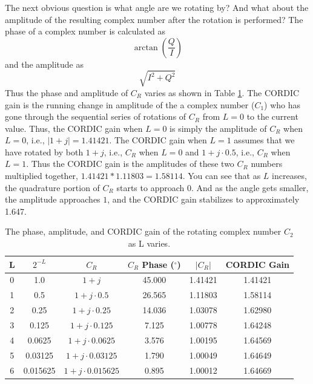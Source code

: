 The next obvious question is what angle are we rotating by? And what about the amplitude of the resulting complex number after the rotation is performed? The phase of a complex number is calculated as 
\begin{equation}
\arctan (\frac{Q}{I})
\end{equation}
and the amplitude as
\begin{equation}
\sqrt{I^2 + Q^2}
\end{equation}
Thus the phase and amplitude of $C_R$ varies as shown in Table \ref{table:complexcordic}. The CORDIC gain is the running change in amplitude of the a complex number ($C_1$) who has gone through the sequential series of rotations of $C_R$ from $L = 0$ to the current value. Thus, the CORDIC gain when $L=0$ is simply the amplitude of $C_R$ when $L=0$, i.e., $| 1 + j | = 1.41421$. The CORDIC gain when $L = 1$ assumes that we have rotated by both $1 + j$, i.e., $C_R$ when $L=0$ and $1 + j \cdot 0.5$, i.e., $C_R$ when $L=1$. Thus the CORDIC gain is the amplitudes of these two $C_R$ numbers multiplied together, $1.41421 * 1.11803 = 1.58114$. You can see that as $L$ increases, the quadrature portion of $C_R$ starts to approach $0$. And as the angle gets smaller, the amplitude approaches $1$, and the CORDIC gain stabilizes to approximately 1.647. 


\begin{table}[htbp]
\caption{The phase, amplitude, and CORDIC gain of the rotating complex number $C_2$ as L varies.}
\begin{center}
\begin{tabular}{|c|c|c|c|c|c|}
\hline
L & $2^{-L}$ 	& $C_R$ 				& $C_R$ Phase ($^{\circ}$) 	& $| C_R |$ 		& CORDIC Gain 	\\ \hline \hline
0 & 1.0 		& $1 + j$  				& 45.000					& 1.41421			& 1.41421		\\ \hline
1 & 0.5 		& $1 + j \cdot 0.5$  		& 26.565					& 1.11803			& 1.58114		\\ \hline
2 & 0.25 		& $1 + j \cdot 0.25$  	& 14.036					& 1.03078			& 1.62980		\\ \hline
3 & 0.125 		& $1 + j \cdot 0.125$  	& 7.125					& 1.00778			& 1.64248		\\ \hline
4 & 0.0625 	& $1 + j \cdot 0.0625$  	& 3.576					& 1.00195			& 1.64569		\\ \hline
5 & 0.03125 	& $1 + j \cdot 0.03125$  	& 1.790					& 1.00049			& 1.64649		\\ \hline
6 & 0.015625 	& $1 + j \cdot 0.015625$  	& 0.895					& 1.00012			& 1.64669		\\ \hline
\end{tabular}
\end{center}
\label{table:complexcordic}
\end{table}%